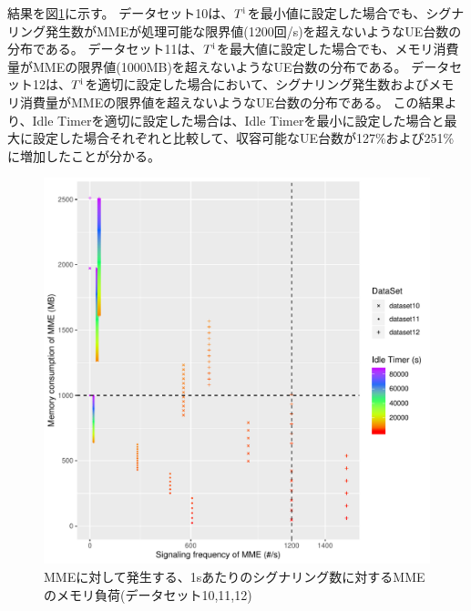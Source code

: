 \documentclass[a4j]{ujarticle}
\begin{document}
結果を図\ref{10_11_12_signaling_vs_memoryload}に示す。
データセット10は、$T^{\rm i}$を最小値に設定した場合でも、シグナリング発生数がMMEが処理可能な限界値(1200回/s)を超えないようなUE台数の分布である。
データセット11は、$T^{\rm i}$を最大値に設定した場合でも、メモリ消費量がMMEの限界値(1000MB)を超えないようなUE台数の分布である。
データセット12は、$T^{\rm i}$を適切に設定した場合において、シグナリング発生数およびメモリ消費量がMMEの限界値を超えないようなUE台数の分布である。
この結果より、Idle Timerを適切に設定した場合は、Idle Timerを最小に設定した場合と最大に設定した場合それぞれと比較して、収容可能なUE台数が127\%および251\%に増加したことが分かる。
\begin{figure}[htbp]
  \centering
  \includegraphics[width=0.9\hsize]{10_11_12_signaling_vs_memoryload_all_300s.pdf}
  \caption{MMEに対して発生する、1sあたりのシグナリング数に対するMMEのメモリ負荷(データセット10,11,12)}
  \label{10_11_12_signaling_vs_memoryload}
\end{figure}

\clearpage


\end{document}
